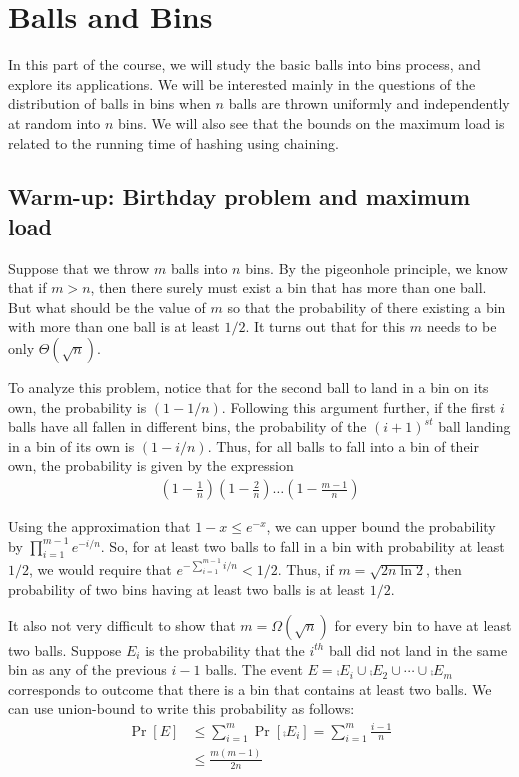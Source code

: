 \chapter{Balls and Bins}

In this part of the course, we will study the basic balls into bins process, and explore its applications. We will be interested mainly in the questions of the distribution of balls in bins when $n$ balls are thrown uniformly and independently at random into $n$ bins. We will also see that the bounds on the maximum load is related to the running time of hashing using chaining. 

\section{Warm-up: Birthday problem and maximum load}

Suppose that we throw $m$ balls into $n$ bins. By the pigeonhole principle, we know that if $m > n$, then there surely must exist a bin that has more than one ball. But what should be the value of $m$ so that the probability of there existing a bin with more than one ball is at least $1/2$. It turns out that for this $m$ needs to be only $\Theta(\sqrt{n})$. 

To analyze this problem, notice that for the second ball to land in a bin on its
own, the probability is $(1 - 1/n)$. Following this argument further, if the
first $i$ balls have all fallen in different bins, the probability of the
$(i+1)^{st}$ ball landing in a bin of its own is $(1 - i/n)$. Thus, for all
balls to fall into a bin of their own, the probability is given by the
expression
\begin{align*}
	\left(1 - \frac{1}{n}\right) \left( 1 - \frac{2}{n}\right) \ldots \left(1 - \frac{m-1}{n}\right)
\end{align*}

Using the approximation that $1-x \leq e^{-x}$, we can upper bound the
probability by $\prod_{i=1}^{m-1} e^{-i/n}$. So, for at least two balls to fall
in a bin with probability at least $1/2$, we would require that
$e^{-\sum_{i=1}^{m-1} i/n} < 1/2.$ Thus, if $m = \sqrt{2n\ln 2}$, then
probability of two bins having at least two balls is at least $1/2$.

It also not very difficult to show that $m = \Omega(\sqrt{n})$ for every bin to
have at least two balls.  Suppose $E_i$ is the probability that the $i^{th}$
ball did not land in the same bin as any of the previous $i-1$ balls. The event
$E = \comp{E}_i \cup \comp{E}_2 \cup \cdots \cup \comp{E}_m$ corresponds to
outcome that there is a bin that contains at least two balls. We can use
union-bound to write this probability as follows:
\begin{align*}
  \Pr[E] &\leq \sum_{i=1}^m \Pr[\comp{E}_i] = \sum_{i=1}^m \frac{i-1}{n}\\
  &\leq \frac{m(m-1)}{2n}
\end{align*}

